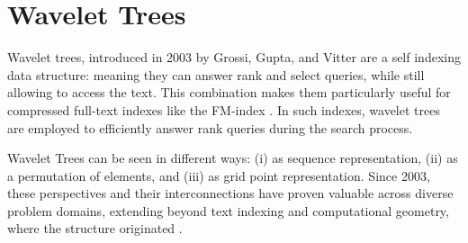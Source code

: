 \clearpage
\section{Wavelet Trees} \label{sec:wavelet_trees}
\noindent Wavelet trees, introduced in 2003 by Grossi, Gupta, and Vitter \cite{GrossiWT2003,} are a self indexing data structure: meaning they can answer rank and select queries, while still allowing to access the text. This combination makes them particularly useful for compressed full-text indexes like the FM-index \cite{ferragina2000opportunistic}. In such indexes, wavelet trees are employed to efficiently answer rank queries during the search process. \vspace{0.4cm}


 \vspace{0.4cm}

\noindent Wavelet Trees can be seen in different ways: (i) as sequence representation, (ii) as a permutation of elements, and (iii) as grid point representation. Since 2003, these perspectives and their interconnections have proven valuable across diverse problem domains, extending beyond text indexing and computational geometry, where the structure originated \cite{WTForALL,WTFromTheoryToPractice,TheMyriadVirtuesWT}.

